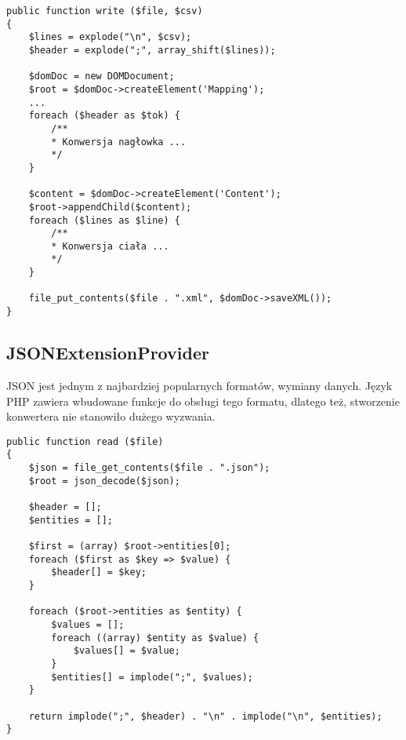 \begin{empty}
	\begin{verbatim}
public function write ($file, $csv)
{
	$lines = explode("\n", $csv);
	$header = explode(";", array_shift($lines));
	
	$domDoc = new DOMDocument;
	$root = $domDoc->createElement('Mapping');
	...
	foreach ($header as $tok) {
		/**
		* Konwersja nagłowka ...
		*/
	}
	
	$content = $domDoc->createElement('Content');
	$root->appendChild($content);
	foreach ($lines as $line) {
		/**
		* Konwersja ciała ...
		*/
	}
	
	file_put_contents($file . ".xml", $domDoc->saveXML());
}
	\end{verbatim}
	\vspace{-10pt}
\end{empty}

\subsection{JSONExtensionProvider}
JSON jest jednym z najbardziej popularnych formatów, wymiany danych. Język PHP zawiera wbudowane funkcje do obsługi tego formatu, dlatego też, stworzenie konwertera nie stanowiło dużego wyzwania. 

\begin{empty}
	\begin{verbatim}
public function read ($file)
{
	$json = file_get_contents($file . ".json");
	$root = json_decode($json);
	
	$header = [];
	$entities = [];
	
	$first = (array) $root->entities[0];
	foreach ($first as $key => $value) {
		$header[] = $key;
	}
	
	foreach ($root->entities as $entity) {
		$values = [];
		foreach ((array) $entity as $value) {
			$values[] = $value;
		}
		$entities[] = implode(";", $values);
	}
	
	return implode(";", $header) . "\n" . implode("\n", $entities);
}
	\end{verbatim}
	\vspace{-10pt}
\end{empty}

